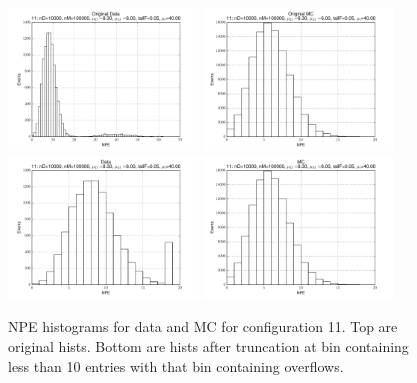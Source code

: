  \begin{figure}[htbp] \begin{center} 
\includegraphics[width=0.45\textwidth]{../FIGURES/11/FIG_Original_Data.pdf} 
\includegraphics[width=0.45\textwidth]{../FIGURES/11/FIG_Original_MC.pdf} 
\includegraphics[width=0.45\textwidth]{../FIGURES/11/FIG_Data.pdf} 
\includegraphics[width=0.45\textwidth]{../FIGURES/11/FIG_MC.pdf} 
\caption{NPE histograms for data and MC for configuration 11. Top are original hists. Bottom are hists after truncation at bin containing less than 10 entries with that bin containing overflows.} 
\label{tab:npe_11} 
\end{center} \end{figure} 

 